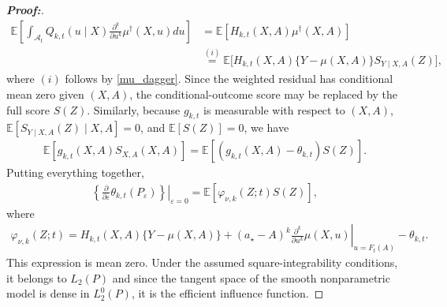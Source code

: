 \documentclass[11pt,twoside]{article}
\theoremstyle{definition}
\theoremstyle{remark}
\begin{document}
\begin{proof}[\textbf{Proof:}]
\begin{align*}
     \mathbb{E}\left[ \int_{\mathcal{A}_t} Q_{k,t}(u\mid X) \frac{\partial^k}{\partial u^k} \mu^\dagger(X,u)du \right] &= \mathbb{E}\left[H_{k,t}(X,A)\mu^\dagger(X,A) \right] \\
     &\overset{(i)}{=} \mathbb{E}\Big[H_{k,t}(X,A) \{Y-\mu(X,A)\}S_{Y\mid X,A}(Z) \Big],
\end{align*}
where $(i)$ follows by \cref{mu_dagger}. Since the weighted residual has conditional mean zero given $(X,A)$, the conditional-outcome score may be replaced by the full score $S(Z)$. Similarly, because $g_{k,t}$ is measurable with respect to $(X,A)$, $\mathbb{E}[S_{Y\mid X,A}(Z)\mid X,A]=0$, and $\mathbb{E}[S(Z)]=0$, we have
\begin{align*}
    \mathbb{E}\left[ g_{k,t}(X,A)S_{X,A}(X,A)\right] = \mathbb{E}\left[ (g_{k,t}(X,A)-\theta_{k,t})S(Z) \right].
\end{align*}
Putting everything together, 
\begin{align*}
    \left. \left\{  \frac{\partial}{\partial\varepsilon} \theta_{k,t}(P_\varepsilon) \right\}\right|_{\varepsilon=0} = \mathbb{E}\left[ \varphi_{\nu,k}(Z;t)S(Z) \right],
\end{align*}
where
\begin{align*}
    \varphi_{\nu,k}(Z;t) =  H_{k,t}(X,A)\{Y-\mu(X,A)\} + (a_\star-A)^k \left. \frac{\partial^k}{\partial u^k}\mu(X,u) \right|_{u=F_t(A)} - \theta_{k,t}.
\end{align*}
This expression is mean zero. Under the assumed square-integrability conditions, it belongs to $L_2(P)$ and since the tangent space of the smooth nonparametric model is dense in $L_2^0(P)$, it is the efficient influence function. \bigskip


\end{proof}
\end{document}
